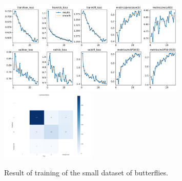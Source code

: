 \documentclass{cpsc202}
\begin{document}
    \begin{figure}
        \begin{center}
            \includegraphics[width=0.8\textwidth]{trained_two_classes/results}
            \includegraphics[width=0.4\textwidth]{trained_two_classes/confusion_matrix}
        \end{center}
        \caption{Result of training of the small dataset of butterflies.}
        \label{fig:results-two-classes}
    \end{figure}
\end{document}
